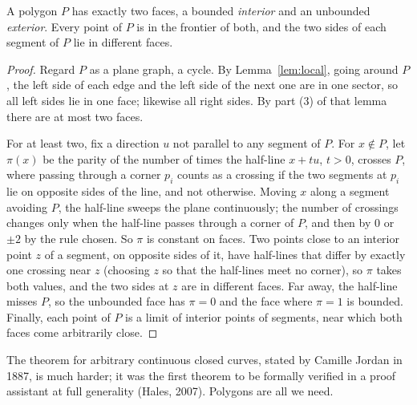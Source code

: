 \begin{lemma}\label{lem:jordan}
A polygon $P$ has exactly two faces, a bounded \emph{interior} and an unbounded \emph{exterior}. Every point of $P$ is in the frontier of both, and the two
sides of each segment of $P$ lie in different faces.
\end{lemma}
\begin{proof}
Regard $P$ as a plane graph, a cycle. By Lemma~\ref{lem:local}, going around $P$, the left side of each edge and the left side of the next one are in one
sector, so all left sides lie in one face; likewise all right sides. By part (3) of that lemma there are at most two faces.

For at least two, fix a direction $u$ not parallel to any segment of $P$. For $x\notin P$, let $\pi(x)$ be the parity of the number of times the half-line
$x+tu$, $t>0$, crosses $P$, where passing through a corner $p_i$ counts as a crossing if the two segments at $p_i$ lie on opposite sides of the line, and
not otherwise. Moving $x$ along a segment avoiding $P$, the half-line sweeps the plane continuously; the number of crossings changes only when the
half-line passes through a corner of $P$, and then by $0$ or $\pm2$ by the rule chosen. So $\pi$ is constant on faces. Two points close to an interior point $z$ of a
segment, on opposite sides of it, have half-lines that differ by exactly one crossing near $z$ (choosing $z$ so that the half-lines meet no corner), so $\pi$
takes both values, and the two sides at $z$ are in different faces. Far away, the half-line misses $P$, so the unbounded face has $\pi=0$ and the face where
$\pi=1$ is bounded. Finally, each point of $P$ is a limit of interior points of segments, near which both faces come arbitrarily close.
\end{proof}

The theorem for arbitrary continuous closed curves, stated by Camille Jordan in 1887, is much harder; it was the first theorem to be
formally verified in a proof assistant at full generality (Hales, 2007). Polygons are all we need.

